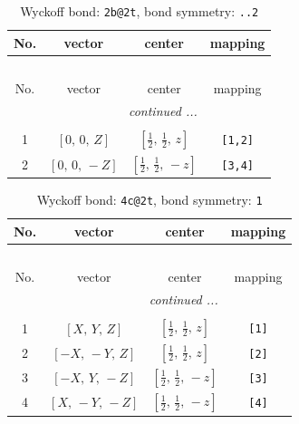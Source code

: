 \documentclass[fleqn,8pt]{jsarticle}
\begin{document}
\renewcommand{\arraystretch}{1.2}
\begin{longtable}{cccc}
\caption{Wyckoff bond: {\tt 2b@2t}, bond symmetry: {\tt ..2}}
 \\
 \hline \hline
No. & vector & center & mapping \\ \hline \endfirsthead

\multicolumn{3}{l}{\tablename\ \thetable{}} \\
 \hline \hline
No. & vector & center & mapping \\ \hline \endhead

 \hline \hline
\multicolumn{3}{r}{\footnotesize\it continued ...} \\ \endfoot

 \hline \hline
\multicolumn{3}{r}{} \\ \endlastfoot

1 & $\left[ 0,\, 0,\, Z \right]$ & $\left[ \frac{1}{2},\, \frac{1}{2},\, z \right]$ & {\tt [1,2]} \\ \hline
2 & $\left[ 0,\, 0,\, - Z \right]$ & $\left[ \frac{1}{2},\, \frac{1}{2},\, - z \right]$ & {\tt [3,4]} \\
\end{longtable}
\renewcommand{\arraystretch}{1.2}
\begin{longtable}{cccc}
\caption{Wyckoff bond: {\tt 4c@2t}, bond symmetry: {\tt 1}}
 \\
 \hline \hline
No. & vector & center & mapping \\ \hline \endfirsthead

\multicolumn{3}{l}{\tablename\ \thetable{}} \\
 \hline \hline
No. & vector & center & mapping \\ \hline \endhead

 \hline \hline
\multicolumn{3}{r}{\footnotesize\it continued ...} \\ \endfoot

 \hline \hline
\multicolumn{3}{r}{} \\ \endlastfoot

1 & $\left[ X,\, Y,\, Z \right]$ & $\left[ \frac{1}{2},\, \frac{1}{2},\, z \right]$ & {\tt [1]} \\ \hline
2 & $\left[ - X,\, - Y,\, Z \right]$ & $\left[ \frac{1}{2},\, \frac{1}{2},\, z \right]$ & {\tt [2]} \\ \hline
3 & $\left[ - X,\, Y,\, - Z \right]$ & $\left[ \frac{1}{2},\, \frac{1}{2},\, - z \right]$ & {\tt [3]} \\ \hline
4 & $\left[ X,\, - Y,\, - Z \right]$ & $\left[ \frac{1}{2},\, \frac{1}{2},\, - z \right]$ & {\tt [4]} \\
\end{longtable}
\end{document}
